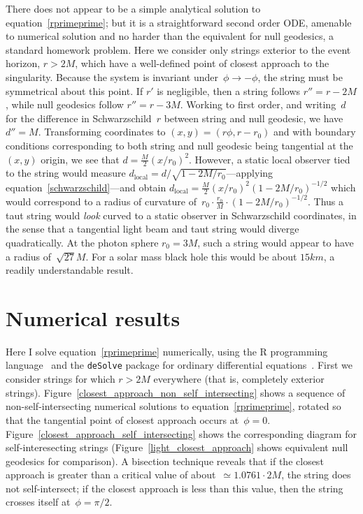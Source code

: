 \documentclass{ws-tpe}
\begin{document}
There does not appear to be a simple analytical solution to
equation~\ref{rprimeprime}; but it is a straightforward second order
ODE, amenable to numerical solution and no harder than the equivalent
for null geodesics, a standard homework problem.  Here we consider
only strings exterior to the event horizon, $r>2M$, which have a
well-defined point of closest approach to the singularity.  Because
the system is invariant under~$\phi\longrightarrow-\phi$, the string
must be symmetrical about this point.  If $r'$ is negligible, then a string
follows $r''=r-2M$, while null geodesics follow $r''=r-3M$.
Working to first order, and writing~$d$ for the difference in
Schwarzschild~$r$ between string and null geodesic, we have $d''=M$.
Transforming coordinates to $(x,y) = (r\phi,r-r_0)$ and with boundary
conditions corresponding to both string and null geodesic being
tangential at the $(x,y)$ origin, we see that
$d=\frac{M}{2}(x/r_0)^2$.  However, a static local observer tied to
the string would measure
$d_\mathrm{local}=d/\sqrt{1-2M/r_0}$---applying
equation~\ref{schwarzschild}---and obtain
$d_\mathrm{local}=\frac{M}{2}(x/r_0)^2\left(1-2M/r_0\right)^{-1/2}$
which would correspond to a radius of curvature
of~$r_0\cdot\frac{r_0}{M}\cdot\left(1-2M/r_0\right)^{-1/2}$.  Thus a
taut string would {\em look} curved to a static observer in
Schwarzschild coordinates, in the sense that a tangential light beam
and taut string would diverge quadratically.  At the photon sphere
$r_0=3M$, such a string would appear to have a radius of~$\sqrt{27}M$.
For a solar mass black hole this would be about $15\unit{km}$, a
readily understandable result.


\section{Numerical results}

Here I solve equation~\ref{rprimeprime} numerically, using the R
programming language~\cite{rcore2019} and the \verb+deSolve+ package
for ordinary differential equations~\cite{soetart2010}.  First we
consider strings for which $r>2M$ everywhere (that is, completely
exterior strings).
Figure~\ref{closest_approach_non_self_intersecting} shows a sequence
of non-self-intersecting numerical solutions to
equation~\ref{rprimeprime}, rotated so that the tangential point of
closest approach occurs at~$\phi=0$.
Figure~\ref{closest_approach_self_intersecting} shows the
corresponding diagram for self-interesecting strings
(Figure~\ref{light_closest_approach} shows equivalent null geodesics
for comparison).  A bisection technique reveals that if the closest
approach is greater than a critical value of about~$\simeq 1.0761\cdot
2M$, the string does not self-intersect; if the closest approach is
less than this value, then the string crosses itself at~$\phi=\pi/2$.
\end{document}
